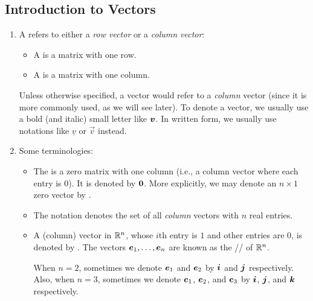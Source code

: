 \subsection{Introduction to Vectors}
\begin{enumerate}
\item A  refers to either a \emph{row vector} or a \emph{column
vector}:
\begin{itemize}
\item A  is a matrix with one row.
\item A  is a matrix with one column.
\end{itemize}
Unless otherwise specified, a vector would refer to a \emph{column} vector
(since it is more commonly used, as we will see later). To denote a vector, we
usually use a bold (and italic) small letter like \(\vb*{v}\). In written
form, we usually use notations like \(\underline{v}\) or \(\vec{v}\) instead.

\item Some terminologies:
\begin{itemize}
\item The  is a zero matrix with one column (i.e., a column
vector where each entry is \(0\)). It is denoted by \(\vb*{0}\). More explicitly, we may denote an \(n\times 1\) zero vector by .
\item The notation  denotes the set of all \emph{column} vectors with \(n\)
real entries.
\item A (column) vector in \(\mathbb{R}^n\), whose \(i\)th entry is \(1\) and other
entries are \(0\), is denoted by . The vectors
\(\vb*{e}_{1},\dotsc,\vb*{e}_{n}\) are known as the // of
\(\mathbb{R}^n\).

\begin{note}
When \(n=2\), sometimes we denote \(\vb*{e}_{1}\) and \(\vb*{e}_{2}\) by
\(\vb*{i}\) and \(\vb*{j}\) respectively. Also, when \(n=3\), sometimes we
denote \(\vb*{e}_{1}\), \(\vb*{e}_{2}\), and \(\vb*{e}_{3}\) by
\(\vb*{i}\), \(\vb*{j}\), and \(\vb*{k}\) respectively.
\end{note}
\end{itemize}


\end{enumerate}
